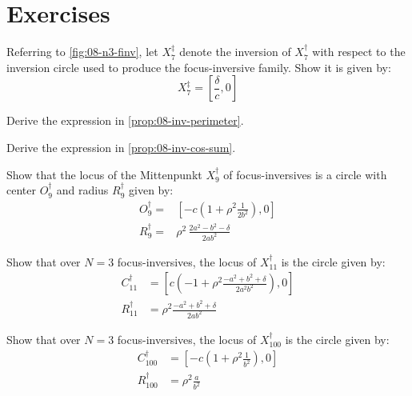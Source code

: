 \section{Exercises}

\begin{exercise}
Referring to \cref{fig:08-n3-finv}, let  $X_7^\ddagger$ denote the inversion of $X_7^\dagger$ with respect to the inversion circle used to produce the focus-inversive family. Show it is given by:
\[ X_7^\ddagger=\left[\frac{\delta}{c},0\right]\]
\label{exe:08-x7-ddagger}
\end{exercise}

\begin{exercise}
Derive the expression in \cref{prop:08-inv-perimeter}.
\end{exercise}

\begin{exercise}
Derive the expression in \cref{prop:08-inv-cos-sum}.
\end{exercise}

\begin{exercise}
Show that the locus of the Mittenpunkt  $X_9^\dagger$ of focus-inversives is a circle with center $O_9^\dagger$ and radius $R_9^\dagger$ given by:
\begin{align*}
    O_9^\dagger=&\left[-c\left(1+\rho^2 \frac{1}{2b^2}\right), 0\right] \\
    R_9^\dagger=&\rho^2\, \frac{2a^2-b^2-\delta}{2 a b^2}
\end{align*}
\label{exe:08-moving-billiard-table}
\end{exercise}

\begin{exercise}
Show that over $N=3$ focus-inversives, the locus of $X_{11}^\dagger$ is the circle given by:
\begin{align*}
C_{11}^\dagger&=\left[c\left(-1+\rho^2\frac{-a^2+b^2+\delta }{2 a^2 b^2}\right),0\right]\\
R_{11}^\dagger&=\rho^2\frac{-a^2+b^2+\delta}{2 a b^2}
\end{align*}
\label{exe:08-x11}
\end{exercise}

\begin{exercise}
Show that over $N=3$ focus-inversives, the locus of $X_{100}^\dagger$ is the circle given by:
\begin{align*}
C_{100}^\dagger&=\left[-c\left(1+\rho^2\frac{1}{b^2}\right),0\right]\\
R_{100}^\dagger&=\rho^2\frac{a}{b^2}
\end{align*}
\end{exercise}

